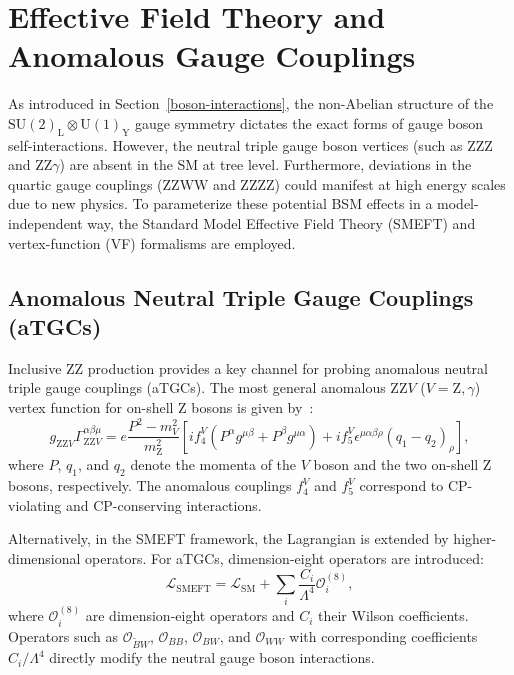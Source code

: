 \section{Effective Field Theory and Anomalous Gauge Couplings}
\label{sec:theory_eft}

As introduced in Section~\ref{boson-interactions}, the non-Abelian structure of the $\mathrm{SU}(2)_{\text{L}} \otimes \mathrm{U}(1)_{\text{Y}}$ gauge symmetry dictates the exact forms of gauge boson self-interactions. However, the neutral triple gauge boson vertices (such as $\text{ZZZ}$ and $\text{ZZ}\gamma$) are absent in the SM at tree level. Furthermore, deviations in the quartic gauge couplings ($\text{ZZWW}$ and $\text{ZZZZ}$) could manifest at high energy scales due to new physics. To parameterize these potential BSM effects in a model-independent way, the Standard Model Effective Field Theory (SMEFT) and vertex-function (VF) formalisms are employed.

\subsection{Anomalous Neutral Triple Gauge Couplings (aTGCs)}
\label{subsec:theory_atgc}

Inclusive $\text{ZZ}$ production provides a key channel for probing anomalous neutral triple gauge couplings (aTGCs). The most general anomalous $\text{ZZ}V$ ($V = \text{Z}, \gamma$) vertex function for on-shell Z bosons is given by~\cite{Baur2000}:
\begin{equation}
    g_{\text{ZZ}V} \Gamma_{\text{ZZ}V}^{\alpha\beta\mu} = 
    e \frac{P^2 - m_V^2}{m_{\text{Z}}^2} 
    \left[ 
    i f_4^V (P^\alpha g^{\mu\beta} + P^\beta g^{\mu\alpha}) 
    + i f_5^V \epsilon^{\mu\alpha\beta\rho}(q_1 - q_2)_\rho 
    \right],
\label{eq:vf_atgc}
\end{equation}
where $P$, $q_1$, and $q_2$ denote the momenta of the $V$ boson and the two on-shell Z bosons, respectively. The anomalous couplings $f_4^V$ and $f_5^V$ correspond to CP-violating and CP-conserving interactions.

Alternatively, in the SMEFT framework, the Lagrangian is extended by higher-dimensional operators. For aTGCs, dimension-eight operators are introduced:
\begin{equation}
    \mathcal{L}_{\text{SMEFT}} = \mathcal{L}_{\text{SM}} + \sum_i \frac{C_i}{\Lambda^4} \mathcal{O}_i^{(8)},
\label{eq:smeft_atgc}
\end{equation}
where $\mathcal{O}_i^{(8)}$ are dimension-eight operators and $C_i$ their Wilson coefficients. Operators such as $\mathcal{O}_{\widetilde{B}W}$, $\mathcal{O}_{BB}$, $\mathcal{O}_{BW}$, and $\mathcal{O}_{WW}$ with corresponding coefficients $C_i/\Lambda^4$ directly modify the neutral gauge boson interactions.

